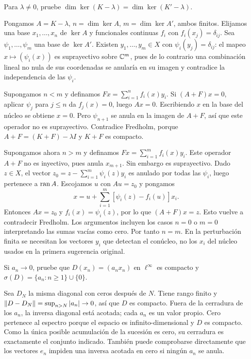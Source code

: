\begin{ejercicio}\label{ej:v3-l10-4}
Para $\lambda\ne0$, pruebe $\dim\ker(K-\lambda)=\dim\ker(K'-\lambda)$.
\end{ejercicio}
\begin{solucion}
Pongamos $A=K-\lambda$, $n=\dim\ker A$, $m=\dim\ker A'$, ambos finitos. Elijamos una base $x_1,\ldots,x_n$ de $\ker A$ y funcionales continuas $f_i$ con $f_i(x_j)=\delta_{ij}$. Sea $\psi_1,\ldots,\psi_m$ una base de $\ker A'$. Existen $y_1,\ldots,y_m\in X$ con $\psi_i(y_j)=\delta_{ij}$: el mapeo $x\mapsto(\psi_i(x))$ es suprayectivo sobre $\mathbb C^m$, pues de lo contrario una combinación lineal no nula de sus coordenadas se anularía en su imagen y contradice la independencia de las $\psi_i$.

Supongamos $n<m$ y definamos $F x=\sum_{i=1}^nf_i(x)y_i$. Si $(A+F)x=0$, aplicar $\psi_j$ para $j\le n$ da $f_j(x)=0$, luego $Ax=0$. Escribiendo $x$ en la base del núcleo se obtiene $x=0$. Pero $\psi_{n+1}$ se anula en la imagen de $A+F$, así que este operador no es suprayectivo. Contradice Fredholm, porque $A+F=(K+F)-\lambda I$ y $K+F$ es compacto.

Supongamos ahora $n>m$ y definamos $F x=\sum_{i=1}^mf_i(x)y_i$. Este operador $A+F$ no es inyectivo, pues anula $x_{m+1}$. Sin embargo es suprayectivo. Dado $z\in X$, el vector $z_0=z-\sum_{i=1}^m\psi_i(z)y_i$ es anulado por todas las $\psi_i$, luego pertenece a $\operatorname{ran} A$. Escojamos $u$ con $Au=z_0$ y pongamos
\[x=u+\sum_{i=1}^m[\psi_i(z)-f_i(u)]x_i.
\]
Entonces $Ax=z_0$ y $f_i(x)=\psi_i(z)$, por lo que $(A+F)x=z$. Esto vuelve a contradecir Fredholm. Los argumentos incluyen los casos $n=0$ o $m=0$ interpretando las sumas vacías como cero. Por tanto $n=m$. En la perturbación finita se necesitan los vectores $y_i$ que detectan el conúcleo, no los $x_i$ del núcleo usados en la primera sugerencia original.
\end{solucion}

\begin{ejercicio}\label{ej:v3-l11-1}
Si $a_n\to0$, pruebe que $D(x_n)=(a_nx_n)$ en $\ell^\infty$ es compacto y $\sigma(D)=\{a_n:n\ge1\}\cup\{0\}$.
\end{ejercicio}
\begin{solucion}
Sea $D_N$ la misma diagonal con ceros después de $N$. Tiene rango finito y $\left\lVert D-D_N\right\rVert=\sup_{n>N}|a_n|\to0$, así que $D$ es compacto. Fuera de la cerradura de los $a_n$, la inversa diagonal está acotada; cada $a_n$ es un valor propio. Cero pertenece al espectro porque el espacio es infinito-dimensional y $D$ es compacto. Como la única posible acumulación de la sucesión es cero, su cerradura es exactamente el conjunto indicado. También puede comprobarse directamente que los vectores $e_n$ impiden una inversa acotada en cero si ningún $a_n$ se anula.
\end{solucion}

